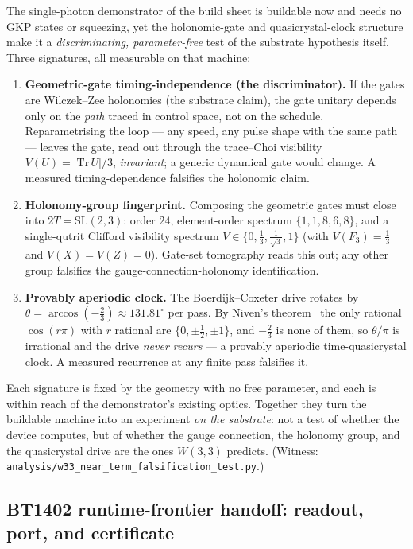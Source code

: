 \documentclass[11pt]{article}
\begin{document}
The single-photon demonstrator of the build sheet is buildable now and needs no
GKP states or squeezing, yet the holonomic-gate and quasicrystal-clock structure
make it a \emph{discriminating, parameter-free} test of the substrate hypothesis
itself. Three signatures, all measurable on that machine:
\begin{enumerate}
\item \textbf{Geometric-gate timing-independence (the discriminator).} If the
  gates are Wilczek--Zee holonomies (the substrate claim), the gate unitary
  depends only on the \emph{path} traced in control space, not on the schedule.
  Reparametrising the loop --- any speed, any pulse shape with the same path ---
  leaves the gate, read out through the trace--Choi visibility $V(U)=|\mathrm{Tr}\,U|/3$,
  \emph{invariant}; a generic dynamical gate would change. A measured
  timing-dependence falsifies the holonomic claim.
\item \textbf{Holonomy-group fingerprint.} Composing the geometric gates must
  close into $2T=\mathrm{SL}(2,3)$: order $24$, element-order spectrum
  $\{1,1,8,6,8\}$, and a single-qutrit Clifford visibility spectrum
  $V\in\{0,\tfrac13,\tfrac1{\sqrt3},1\}$ (with $V(F_3)=\tfrac13$ and
  $V(X)=V(Z)=0$). Gate-set tomography reads this out; any other group falsifies
  the gauge-connection-holonomy identification.
\item \textbf{Provably aperiodic clock.} The Boerdijk--Coxeter drive rotates by
  $\theta=\arccos(-\tfrac23)\approx131.81^\circ$ per pass. By Niven's
  theorem~\cite{niven} the only rational $\cos(r\pi)$ with $r$ rational are
  $\{0,\pm\tfrac12,\pm1\}$, and $-\tfrac23$ is none of them, so $\theta/\pi$ is
  irrational and the drive \emph{never recurs} --- a provably aperiodic
  time-quasicrystal clock. A measured recurrence at any finite pass falsifies it.
\end{enumerate}
Each signature is fixed by the geometry with no free parameter, and each is
within reach of the demonstrator's existing optics. Together they turn the
buildable machine into an experiment \emph{on the substrate}: not a test of
whether the device computes, but of whether the gauge connection, the holonomy
group, and the quasicrystal drive are the ones $W(3,3)$ predicts. (Witness:
\texttt{analysis/w33\_near\_term\_falsification\_test.py}.)

\subsection{BT1402 runtime-frontier handoff: readout, port, and certificate}
\end{document}
